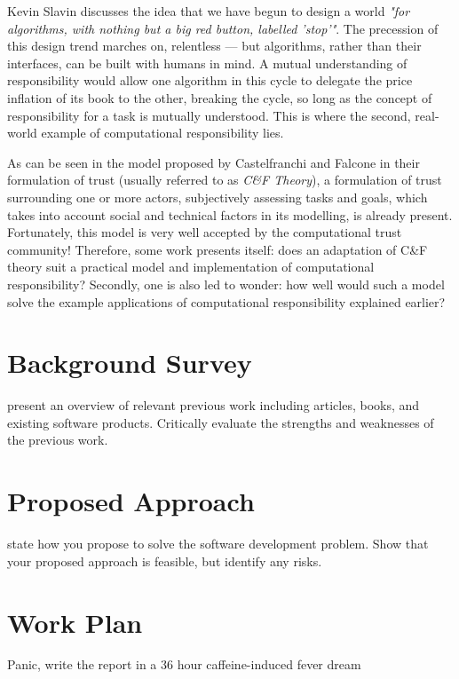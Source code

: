 \documentclass{mprop}
\begin{document}
Kevin Slavin discusses the idea that we have begun to design a world \emph{"for algorithms, with nothing but a big red button, labelled 'stop'"}. The precession of this design trend marches on, relentless --- but algorithms, rather than their interfaces, can be built with humans in mind. A mutual understanding of responsibility would allow one algorithm in this cycle to delegate the price inflation of its book to the other, breaking the cycle, so long as the concept of responsibility for a task is mutually understood. This is where the second, real-world example of computational responsibility lies. \par

As can be seen in the model proposed by Castelfranchi and Falcone in their formulation of trust\cite{CastelfranchiSocialApproach} (usually referred to as \emph{C\&F Theory}), a formulation of trust surrounding one or more actors, subjectively assessing tasks and goals, which takes into account social and technical factors in its modelling, is already present. Fortunately, this model is very well accepted by the computational trust community! Therefore, some work presents itself: does an adaptation of C\&F theory suit a practical model and implementation of computational responsibility? Secondly, one is also led to wonder: how well would such a model solve the example applications of computational responsibility explained earlier?


\section{Background Survey}

present an overview of relevant previous work including articles, books, and existing software products. Critically evaluate the strengths and weaknesses of the previous work.

\section{Proposed Approach}

state how you propose to solve the software development problem. Show that your proposed approach is feasible, but identify any risks.

\section{Work Plan}

Panic, write the report in a 36 hour caffeine-induced fever dream




\end{document}
